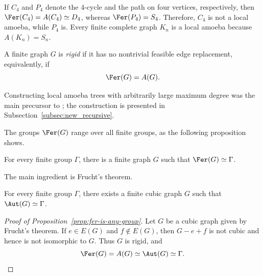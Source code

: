 If $C_4$ and $P_4$ denote the $4$-cycle and the path on four vertices, respectively, then
$\Fer(C_4)=A(C_4)\simeq D_4$, whereas $\Fer(P_4)=S_4$.
Therefore, $C_4$ is not a local amoeba, while $P_4$ is.
Every finite complete graph $K_n$ is a local amoeba because $A(K_n)=S_n$.

\begin{definition}\label{def:rigid-asymmetric}
    A finite graph $G$ is \emph{rigid} if it has no nontrivial feasible edge replacement, equivalently, if
    \[
        \Fer(G)=A(G).
    \]
\end{definition}

Constructing local amoeba trees with arbitrarily large maximum degree was the main precursor to \cite{Eslavaetal2025}; the construction is presented in Subsection~\ref{subsec:new_recursive}.

The groups $\Fer(G)$ range over all finite groups, as the following proposition shows.

\begin{proposition}\label{prop:fer-is-any-group}
    For every finite group $\Gamma$, there is a finite graph $G$ such that $\Fer(G)\simeq\Gamma$.
\end{proposition}

The main ingredient is Frucht's theorem.

\begin{lemma}
    For every finite group $\Gamma$, there exists a finite cubic graph $G$ such that $\Aut(G)\simeq\Gamma$.
\end{lemma}

\begin{proof}[Proof of Proposition~\ref{prop:fer-is-any-group}]
    Let $G$ be a cubic graph given by Frucht's theorem.
    If $e\in E(G)$ and $f\notin E(G)$, then $G-e+f$ is not cubic and hence is not isomorphic to $G$.
    Thus $G$ is rigid, and
    \[
        \Fer(G)=A(G)\simeq\Aut(G)\simeq\Gamma.
    \]
\end{proof}
